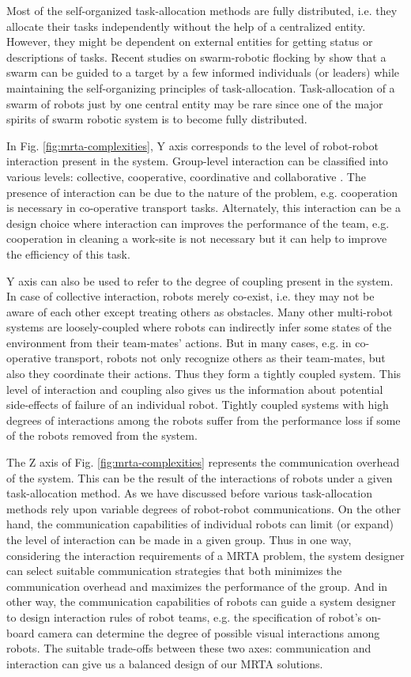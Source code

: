 \documentclass[final,5p,times,twocolumn]{elsarticle}
\begin{document}
Most of the self-organized task-allocation methods are fully distributed, i.e. they allocate their tasks independently without the help of a centralized entity. However, they might be dependent on external entities for getting status or descriptions of tasks. Recent studies on swarm-robotic flocking by \citet{Celikkanat+2008} show that a swarm can be guided to a target by a few informed individuals (or leaders) while  maintaining the self-organizing principles of task-allocation. Task-allocation of a swarm of robots  just by one central entity may be rare since one of the major spirits of swarm robotic system is to become fully distributed.

In Fig. \ref{fig:mrta-complexities},  Y axis corresponds to the level of robot-robot interaction present in the system. Group-level interaction can be classified into various levels: collective, cooperative, coordinative and collaborative \cite{Parker2008}. The presence of interaction can be due to the nature of the problem, e.g. cooperation is necessary in co-operative transport tasks. Alternately, this interaction can be a design choice where interaction can improves the performance of the team, e.g. cooperation in cleaning a work-site is not necessary but it can help to improve the  efficiency of this task. 

Y axis can also be used to refer to the degree of coupling present in the system.  In case of collective interaction, robots merely co-exist, i.e.  they may not be aware of each other except treating others as obstacles. Many other multi-robot systems are loosely-coupled where robots can indirectly infer some states of the environment from their team-mates' actions.  But in many cases, e.g. in  co-operative transport, robots not only recognize others as their team-mates, but also they coordinate their actions. Thus they form a  tightly coupled system. This level of interaction and coupling also gives us the information about potential side-effects of failure of an individual robot. Tightly coupled systems with high degrees of interactions among the robots  suffer from the performance loss if some of the robots removed from the system.

The Z axis of Fig. \ref{fig:mrta-complexities} represents the communication overhead of the system. This can be the result of the interactions  of robots under a given task-allocation method. As we have discussed before various task-allocation methods rely upon variable degrees of robot-robot communications.  On the other hand, the communication capabilities of individual robots can limit (or expand) the level of interaction can be made  in a given group. Thus in one way, considering the interaction requirements of a MRTA problem, the system designer can  select suitable communication strategies that both minimizes the communication overhead and maximizes the performance of the group. And in other way, the communication capabilities of robots can guide a system designer to design interaction rules of robot teams, e.g. the specification of robot's on-board camera  can determine the degree of possible visual interactions among robots. The suitable trade-offs between these two axes: communication and interaction can give us a balanced design of our MRTA solutions.
\end{document}
